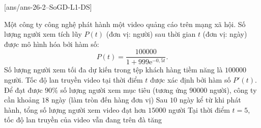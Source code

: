 \cauds
{}[ans/ans-26-2--SoGD-L1-DS]
\begin{ex} %
	Một công ty công nghệ phát hành một video quảng cáo trên mạng xã hội. Số lượng người xem tích lũy $P\left(t\right)$ (đơn vị: người) sau thời gian $t$ (đơn vị: ngày) được mô hình hóa bởi hàm số: $$P\left(t\right) = \dfrac{100000}{1 + 999{\mathrm{e}}^{-0{,}5t}}.$$ Số lượng người xem tối đa dự kiến trong tệp khách hàng tiềm năng là $100000$ người. Tốc độ lan truyền video tại thời điểm $t$ được xác định bởi hàm số $P'\left(t\right)$.	
	{Để đạt được $90\%$ số lượng người xem mục tiêu (tương ứng $90000$ người), công ty cần khoảng $18$ ngày (làm tròn đến hàng đơn vị)}
	{Sau $10$ ngày kể từ khi phát hành, tổng số lượng người xem video đạt hơn $15000$ người}
	{\True Tại thời điểm $t = 5$, tốc độ lan truyền của video vẫn đang trên đà tăng}
\end{ex}

